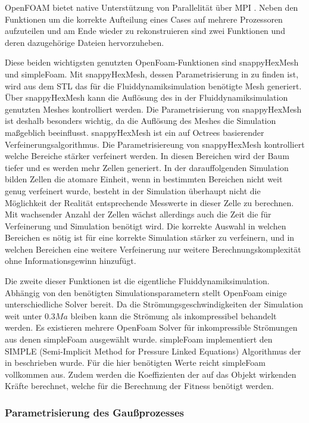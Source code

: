 OpenFOAM bietet native Unterstützung von Parallelität über MPI \cite{OpenMPI.}.
Neben den Funktionen um die korrekte Aufteilung eines Cases auf mehrere Prozessoren aufzuteilen und am Ende wieder zu rekonstruieren sind zwei Funktionen und deren dazugehörige Dateien hervorzuheben.

Diese beiden wichtigsten genutzten OpenFoam-Funktionen sind snappyHexMesh und simpleFoam.
Mit snappyHexMesh, dessen Parametrisierung in  zu finden ist, wird aus dem STL das für die Fluiddynamiksimulation benötigte Mesh generiert. Über snappyHexMesh kann die Auflösung des in der Fluiddynamiksimulation genutzten Meshes kontrolliert werden.
Die Parametrisierung von snappyHexMesh ist deshalb besonders wichtig, da die Auflösung des Meshes die Simulation maßgeblich beeinflusst.
snappyHexMesh ist ein auf Octrees \cite{Meagher.1982} basierender Verfeinerungsalgorithmus.
Die Parametrisiereung von snappyHexMesh kontrolliert welche Bereiche stärker verfeinert werden.
In diesen Bereichen wird der Baum tiefer und es werden mehr Zellen generiert.
In der darauffolgenden Simulation bilden Zellen die atomare Einheit, wenn in bestimmten Bereichen nicht weit genug verfeinert wurde, besteht in der Simulation überhaupt nicht die Möglichkeit der Realität entsprechende Messwerte in dieser Zelle zu berechnen.
Mit wachsender Anzahl der Zellen wächst allerdings auch die Zeit die für Verfeinerung und Simulation benötigt wird.
Die korrekte Auswahl in welchen Bereichen es nötig ist für eine korrekte Simulation stärker zu verfeinern, und in welchen Bereichen eine weitere Verfeinerung nur weitere Berechnungskomplexität ohne Informationsgewinn hinzufügt. 

Die zweite dieser Funktionen ist die eigentliche Fluiddynamiksimulation.
Abhängig von den benötigten Simulationsparametern stellt OpenFoam einige unterschiedliche Solver bereit.
Da die Strömungsgeschwindigkeiten der Simulation weit unter $0.3Ma$ bleiben kann die Strömung als inkompressibel behandelt werden.
Es existieren mehrere OpenFoam Solver für inkompressible Strömungen aus denen simpleFoam ausgewählt wurde.
simpleFoam implementiert den SIMPLE (Semi-Implicit Method for Pressure Linked Equations) Algorithmus der in \cite{Caretto.1973} beschrieben wurde.
Für die hier benötigten Werte reicht simpleFoam vollkommen aus.
Zudem werden die Koeffizienten der auf das Objekt wirkenden Kräfte berechnet, welche für die Berechnung der Fitness benötigt werden. 

\subsubsection{Parametrisierung des Gaußprozesses}



